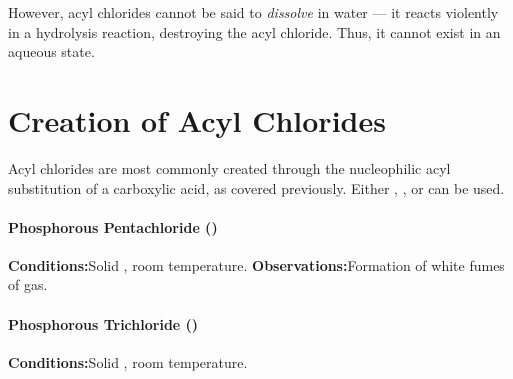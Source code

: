 		However, acyl chlorides cannot be said to \textit{dissolve} in water --- it reacts violently in a hydrolysis reaction, destroying the
		acyl chloride. Thus, it cannot exist in an aqueous state.




	\pagebreak
	\section{Creation of Acyl Chlorides}

		Acyl chlorides are most commonly created through the nucleophilic acyl substitution of a carboxylic acid, as covered previously.
		Either , , or  can be used.


		\paragraph{Phosphorous Pentachloride ()}

		\vspace{1.5em}
		\vbox{\textbf{Conditions:}\tabto{35mm}Solid , room temperature.}
		\vbox{\textbf{Observations:}\tabto{35mm}Formation of white fumes of  gas.}



		\paragraph{Phosphorous Trichloride ()}

		\vspace{1.5em}
		\vbox{\textbf{Conditions:}\tabto{35mm}Solid , room temperature.}




